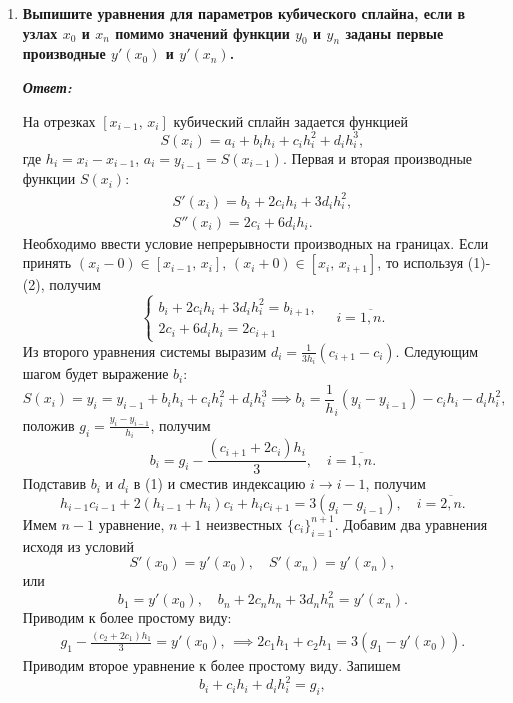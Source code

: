 \documentclass[12pt, a4paper]{article}
\begin{document}
\begin{enumerate}
	\item \textbf{Выпишите уравнения для параметров кубического сплайна, если в узлах $x_0$ и $x_n$ помимо значений функции $y_0$ и $y_n$ заданы первые производные $y'(x_0)$ и $y'(x_n)$.}
	
	\vspace*{0.2cm}
	
	\textit{\textbf{Ответ:}}

	На отрезках $[x_{i-1}, \, x_i]$ кубический сплайн задается функцией
	$$
	S(x_i) = a_i + b_i h_i + c_i h_i^2 + d_i h_i^3,
	$$
	где $h_i = x_i - x_{i- 1}$, $a_i = y_{i-1} = S(x_{i - 1})$. Первая и вторая производные функции $S(x_i)$:
	\begin{gather}
		S'(x_i) = b_i + 2 c_i h_i + 3 d_i h_i^2, \\
		S''(x_i) = 2 c_i + 6 d_i h_i.
	\end{gather}
	Необходимо ввести условие непрерывности производных на границах. Если принять $(x_i - 0) \in [x_{i-1}, \, x_i], \, (x_i + 0) \in [x_i, \, x_{i + 1}] $, то используя (1)-(2), получим 
	\begin{equation*}
		\begin{cases}
			b_i + 2 c_i h_i + 3 d_i h_i^2 = b_{i + 1}, \\
			2 c_i + 6 d_i h_i = 2 c_{i + 1}
		\end{cases}
		\quad i = \overline{1, n}.
	\end{equation*}
	Из второго уравнения системы выразим $d_i = \frac 1 {3h_i} (c_{i + 1} - c_i)$. Следующим шагом будет выражение $b_i$: 
	\[
	S(x_i) = y_i = y_{i -1} + b_i h_i + c_i h_i^2 + d_i h_i^3 \implies b_i = \frac 1 h_i (y_i - y_{i - 1}) - c_i h_i - d_i h_i ^2,
	\]
	положив $g_i = \frac{y_i - y_{i - 1}}{h_i}$, получим
	\[
	b_i = g_i - \frac{(c_{i + 1}+ 2 c_i)h_i}{3}, \quad i = \overline{1, n}.
	\]
	Подставив $b_i$ и $d_i$ в (1) и сместив индексацию $i \rightarrow i - 1$, получим
	\[
	h_{i-1} c_{i-1} + 2 (h_{i -1} + h_i) c_i + h_i c_{i + 1} = 3(g_i - g_{i -1}), \quad i = \overline{2,n}.
	\]
	Имем $n-1$ уравнение, $n+1$ неизвестных $\{c_i \}_{i=1}^{n+1}$. Добавим два уравнения исходя из условий
	\[
	S'(x_0) = y'(x_0), \quad S'(x_n) = y'(x_n),
	\]
	или 
	\[
	b_1 = y'(x_0), \quad b_n + 2 c_n h_n + 3 d_n h_n^2 = y'(x_n).
	\]
	Приводим к более простому виду:
	\begin{gather*}
		g_1 - \frac{(c_{2}+ 2 c_1)h_1}{3} = y'(x_0), \, \implies 2c_1 h_1 + c_2 h_1 = 3(g_1 - y'(x_0)).
	\end{gather*}
	Приводим второе уравнение к более простому виду. Запишем
	\[
		b_i + c_i h_i + d_i h_i^2 = g_i,
\]
\end{enumerate}
\end{document}
